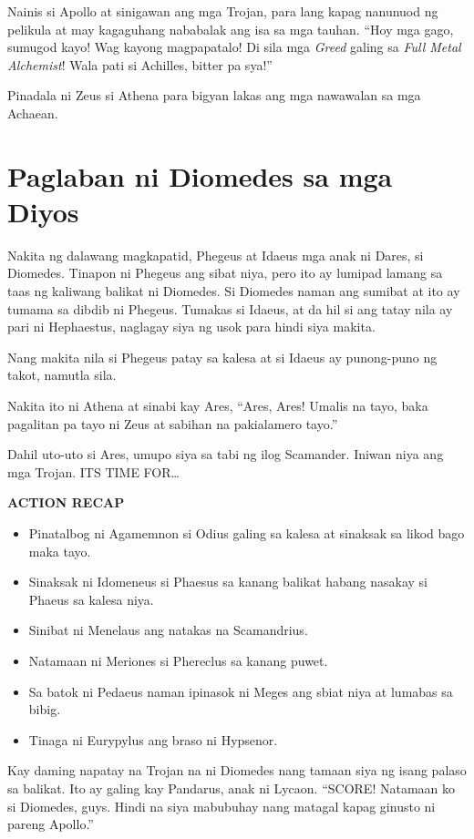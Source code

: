 \documentclass[12pt,letterpaper]{report}
\newenvironment{recap}{\begin{center}{\large\textbf{ACTION RECAP}}\begin{itemize}}{\end{itemize}\end{center}}
\begin{document}
Nainis si Apollo at sinigawan ang mga Trojan, para lang kapag nanunuod ng pelikula at may kagaguhang nababalak ang isa sa mga tauhan. ``Hoy mga gago, sumugod kayo! Wag kayong magpapatalo! Di sila mga \textit{Greed} galing sa \textit{Full Metal Alchemist}! Wala pati si Achilles, bitter pa sya!''

Pinadala ni Zeus si Athena para bigyan lakas ang mga nawawalan sa mga Achaean.

\pagebreak
\chapter{Paglaban ni Diomedes sa mga Diyos}

Nakita ng dalawang magkapatid, Phegeus at Idaeus mga anak ni Dares, si Diomedes. Tinapon ni Phegeus ang sibat niya, pero ito ay lumipad lamang sa taas ng kaliwang balikat ni Diomedes. Si Diomedes naman ang sumibat at ito ay tumama sa dibdib ni Phegeus. Tumakas si Idaeus, at da   hil si ang tatay nila ay pari ni Hephaestus, naglagay siya ng usok para hindi siya makita.

Nang makita nila si Phegeus patay sa kalesa at si Idaeus ay punong-puno ng takot, namutla sila.

Nakita ito ni Athena at sinabi kay Ares, ``Ares, Ares! Umalis na tayo, baka pagalitan pa tayo ni Zeus at sabihan na pakialamero tayo.''

Dahil uto-uto si Ares, umupo siya sa tabi ng ilog Scamander. Iniwan niya ang mga Trojan. ITS TIME FOR\dots

\begin{recap}
    \item Pinatalbog ni Agamemnon si Odius galing sa kalesa at sinaksak sa likod bago maka tayo.
    \item Sinaksak ni Idomeneus si Phaesus sa kanang balikat habang nasakay si Phaeus sa kalesa niya.
    \item Sinibat ni Menelaus ang natakas na Scamandrius.
    \item Natamaan ni Meriones si Phereclus sa kanang puwet.
    \item Sa batok ni Pedaeus naman ipinasok ni Meges ang sbiat niya at lumabas sa bibig.
    \item Tinaga ni Eurypylus ang braso ni Hypsenor.
\end{recap}

Kay daming napatay na Trojan na ni Diomedes nang tamaan siya ng isang palaso sa balikat. Ito ay galing kay Pandarus, anak ni Lycaon. ``SCORE! Natamaan ko si Diomedes, guys. Hindi na siya mabubuhay nang matagal kapag ginusto ni pareng Apollo.''
\end{document}
